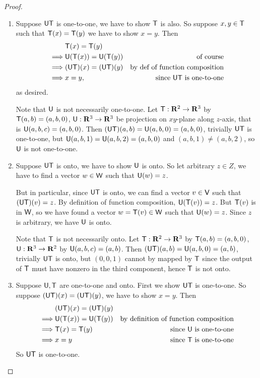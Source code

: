 \begin{proof} \ 
\begin{enumerate}
\item Suppose \(\textsf{U}\textsf{T}\) is one-to-one, we have to show \(\textsf{T}\) is also.
So suppose \(x, y \in \textsf{T}\) such that \(\textsf{T}(x) = \textsf{T}(y)\) we have to show \(x = y\).
Then
\begin{align*}
             & \textsf{T}(x) = \textsf{T}(y) \\
    \implies & \textsf{U}(\textsf{T}(x)) = \textsf{U}(\textsf{T}(y)) & \text{of course} \\
    \implies & (\textsf{U}\textsf{T})(x) = (\textsf{U}\textsf{T})(y) & \text{by def of function composition} \\
    \implies & x = y, & \text{since \(\textsf{U}\textsf{T}\) is one-to-one}
\end{align*}
as desired.

Note that \(\textsf{U}\) is not necessarily one-to-one.
Let \(\textsf{T} : \mathbf{R}^2 \to \mathbf{R}^3\) by \(\textsf{T}(a, b) = (a, b, 0)\), \(\textsf{U} : \mathbf{R}^3 \to \mathbf{R}^3\) be projection on \(xy\)-plane along \(z\)-axis, that is \(\textsf{U}(a, b, c) = (a, b, 0)\).
Then \((\textsf{U}\textsf{T})(a, b) = \textsf{U}(a, b, 0) = (a, b, 0)\), trivially \(\textsf{U}\textsf{T}\) is one-to-one, but \(\textsf{U}(a, b, 1) = \textsf{U}(a, b, 2) = (a, b, 0)\) and \((a, b, 1) \ne (a, b, 2)\), so \(\textsf{U}\) is not one-to-one.

\item
Suppose \(\textsf{U}\textsf{T}\) is onto, we have to show \(\textsf{U}\) is onto.
So let arbitrary \(z \in Z\), we have to find a vector \(w \in \textsf{W}\) such that \(\textsf{U}(w) = z\).

But in particular, since \(\textsf{U}\textsf{T}\) is onto, we can find a vector \(v \in \textsf{V}\) such that \((\textsf{U}\textsf{T})(v) = z\).
By definition of function composition, \(\textsf{U}(\textsf{T}(v)) = z\).
But \(\textsf{T}(v)\) is in \(\textsf{W}\), so we have found a vector \(w = \textsf{T}(v) \in \textsf{W}\) such that \(\textsf{U}(w) = z\).
Since \(z\) is arbitrary, we have \(\textsf{U}\) is onto.

Note that \(\textsf{T}\) is not necessarily onto.
Let \(\textsf{T} : \mathbf{R}^2 \to \mathbf{R}^3\) by \(\textsf{T}(a, b) = (a, b, 0)\), \(\textsf{U} : \mathbf{R}^3 \to \mathbf{R}^2\) by \(\textsf{U}(a, b, c) = (a, b)\).
Then \((\textsf{U}\textsf{T})(a, b) = \textsf{U}(a, b, 0) = (a, b)\), trivially \(\textsf{U}\textsf{T}\) is onto, but \((0, 0, 1)\) cannot by mapped by \(\textsf{T}\) since the output of \(\textsf{T}\) must have nonzero in the third component, hence \(\textsf{T}\) is not onto.

\item Suppose \(\textsf{U}, \textsf{T}\) are one-to-one and onto.
First we show \(\textsf{U}\textsf{T}\) is one-to-one.
So suppose \((\textsf{U}\textsf{T})(x) = (\textsf{U}\textsf{T})(y)\), we have to show \(x = y\).
Then
\begin{align*}
             & (\textsf{U}\textsf{T})(x) = (\textsf{U}\textsf{T})(y) \\
    \implies & \textsf{U}(\textsf{T}(x)) = \textsf{U}(\textsf{T}(y)) & \text{by definition of function composition} \\
    \implies & \textsf{T}(x) = \textsf{T}(y) & \text{since \(\textsf{U}\) is one-to-one} \\
    \implies & x = y & \text{since \(\textsf{T}\) is one-to-one}
\end{align*}
So \(\textsf{U}\textsf{T}\) is one-to-one.


\end{enumerate}
\end{proof}
